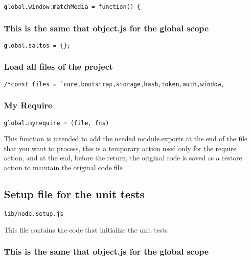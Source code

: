 \documentclass[a4paper]{article}
\begin{document}
\begin{lstlisting}
global.window.matchMedia = function() {
\end{lstlisting}

\hypertarget{toc445}{}
\subsubsection{This is the same that object.js for the global scope}

\begin{lstlisting}
global.saltos = {};
\end{lstlisting}

\hypertarget{toc446}{}
\subsubsection{Load all files of the project}

\begin{lstlisting}
/*const files = `core,bootstrap,storage,hash,token,auth,window,
\end{lstlisting}

\hypertarget{toc447}{}
\subsubsection{My Require}

\begin{lstlisting}
global.myrequire = (file, fns)
\end{lstlisting}

This function is intended to add the needed module.exports at the end of the
file that you want to process, this is a temporary action used only for the
require action, and at the end, before the return, the original code is saved
as a restore action to maintain the original code file

\hypertarget{toc448}{}
\subsection{Setup file for the unit tests}

\begin{lstlisting}
lib/node.setup.js
\end{lstlisting}

This file contains the code that initialize the unit tests

\hypertarget{toc449}{}
\subsubsection{This is the same that object.js for the global scope}
\end{document}
